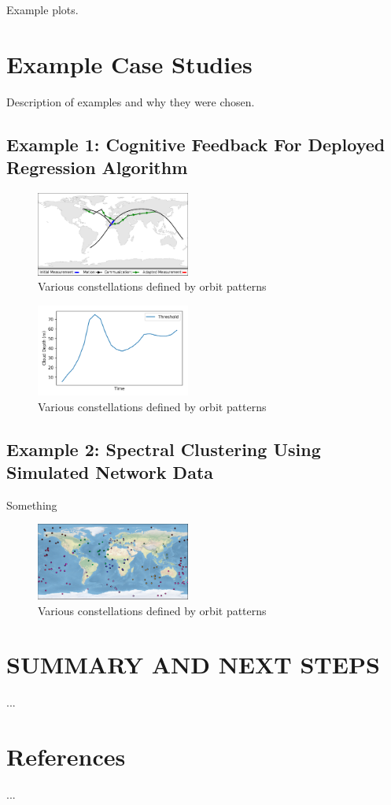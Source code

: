 \documentclass[conference]{IEEEtran}
\begin{document}
Example plots.

\vspace{80pt}

\section{Example Case Studies}

Description of examples and why they were chosen.

\subsection{Example 1: Cognitive Feedback For Deployed Regression Algorithm}

\begin{figure}[htbp]
  \centerline{\includegraphics[width=0.45\textwidth]{images/loop.pdf}}
  \caption{Various constellations defined by orbit patterns}
  \label{fig:loop}
\end{figure}

\begin{figure}[htbp]
  \centerline{\includegraphics[width=0.45\textwidth]{images/regression.png}}
  \caption{Various constellations defined by orbit patterns}
  \label{fig:regression}
\end{figure}

\subsection{Example 2: Spectral Clustering Using Simulated Network Data}

Something

\begin{figure}[htbp]
  \centerline{\includegraphics[width=0.45\textwidth]{images/clusters.pdf}}
  \caption{Various constellations defined by orbit patterns}
  \label{fig:clusters}
\end{figure}

\section{SUMMARY AND NEXT STEPS}

...

\section{References}

...
\end{document}
